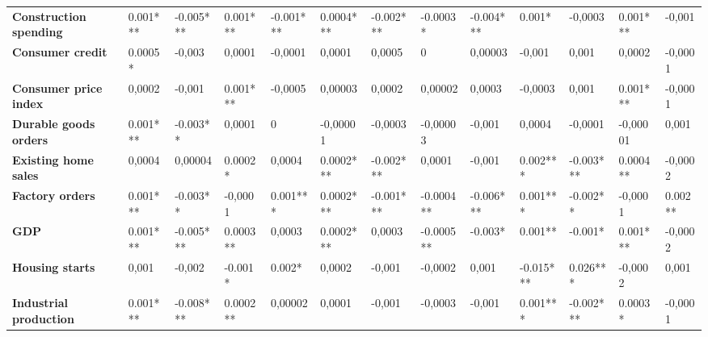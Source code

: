 \begin{landscape}
\begin{table}[]
{\begin{tabular}{@{}lllllllllllll@{}}
\textbf{Construction spending}    & 0.001***           & -0.005***         & 0.001***          & -0.001***         & 0.0004***         & -0.002***         & -0.0003*            & -0.004***          & 0.001*             & -0,0003           & 0.001***          & -0,001            \\
\textbf{Consumer credit}          & 0.0005*            & -0,003            & 0,0001            & -0,0001           & 0,0001            & 0,0005            & 0                   & 0,00003            & -0,001             & 0,001             & 0,0002            & -0,0001           \\
\textbf{Consumer price index}     & 0,0002             & -0,001            & 0.001***          & -0,0005           & 0,00003           & 0,0002            & 0,00002             & 0,0003             & -0,0003            & 0,001             & 0.001***          & -0,0001           \\
\textbf{Durable goods orders}     & 0.001***           & -0.003**          & 0,0001            & 0                 & -0,00001          & -0,0003           & -0,00003            & -0,001             & 0,0004             & -0,0001           & -0,00001          & 0,001             \\
\textbf{Existing home sales}      & 0,0004             & 0,00004           & 0.0002*           & 0,0004            & 0.0002***         & -0.002***         & 0,0001              & -0,001             & 0.002***           & -0.003***         & 0.0004**          & -0,0002           \\
\textbf{Factory orders}           & 0.001***           & -0.003**          & -0,0001           & 0.001***          & 0.0002***         & -0.001***         & -0.0004**           & -0.006***          & 0.001***           & -0.002**          & -0,0001           & 0.002**           \\
\textbf{GDP}                      & 0.001***           & -0.005***         & 0.0003**          & 0,0003            & 0.0002***         & 0,0003            & -0.0005**           & -0.003*            & 0.001**            & -0.001*           & 0.001***          & -0,0002           \\
\textbf{Housing starts}           & 0,001              & -0,002            & -0.001*           & 0.002*            & 0,0002            & -0,001            & -0,0002             & 0,001              & -0.015***          & 0.026***          & -0,0002           & 0,001             \\
\textbf{Industrial production}    & 0.001***           & -0.008***         & 0.0002**          & 0,00002           & 0,0001            & -0,001            & -0,0003             & -0,001             & 0.001***           & -0.002***         & 0.0003*           & -0,0001           \\

\end{tabular}}
\end{table}
\end{landscape}
